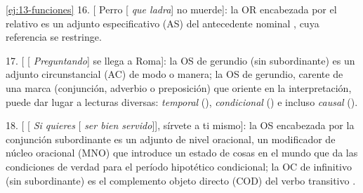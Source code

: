 \begin{solucion}{\ref{ej:13-funciones}}
16. [ Perro [ \textit{que ladra}] no muerde]: la OR
encabezada por el relativo  es un adjunto especificativo (AS) del
antecedente nominal , cuya referencia se restringe.

17. [ [ \textit{Preguntando}] se llega a Roma]: la OS de
gerundio (sin subordinante) es un adjunto circunstancial (AC) de modo o manera;
la OS de gerundio, carente de una marca (conjunción, adverbio o preposición) que
oriente en la interpretación, puede dar lugar a lecturas diversas:
\textit{temporal} (), \textit{condicional} () e incluso \textit{causal} ().

18. [ [ \textit{Si quieres} [ \textit{ser bien
servido}]], sírvete a ti mismo]: la OS encabezada por la conjunción subordinante
 es un adjunto de nivel oracional, un modificador de núcleo oracional
(MNO) que introduce un estado de cosas en el mundo que da las condiciones de
verdad para el período hipotético condicional; la OC de infinitivo (sin
subordinante) es el complemento objeto directo (COD) del verbo transitivo
.
\end{solucion}

